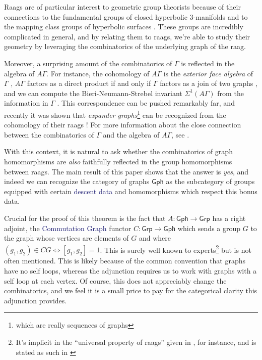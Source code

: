 \documentclass[12pt]{article}
\theoremstyle{definition}
\theoremstyle{theorem}
\newcommand*{\catFont}[1]{\mathsf{#1}}
\newcommand{\Grp}{\catFont{Grp}}
\newcommand*{\important}[1]{\textcolor{MidnightBlue}{#1}}
\begin{document}
  Raags are of particular interest to geometric group theorists because
  of their connections to the fundamental groups of closed hyperbolic
  $3$-manifolds \cite{servatiusSURFACESUBGROUPSGRAPH} 
  and to the mapping class groups of hyperbolic surfaces 
  \cite{kimGeometryCurveGraph2014}.
  These groups are incredibly complicated in general, and by relating
  them to raags, we're able to study their geometry by leveraging
  the combinatorics of the underlying graph of the raag.

  Moreover, a surprising amount of the combinatorics of $\Gamma$ is 
  reflected in the algebra of $A\Gamma$. For instance, the
  cohomology of $A \Gamma$ is the \emph{exterior face algebra} 
  of $\Gamma$ \cite{sabalkaRigidityIsomorphismProblem2009},
  $A\Gamma$ factors as a direct product if and only if $\Gamma$ factors
  as a join of two graphs \cite{servatiusAutomorphismsGraphGroups1989b},
  and we can compute the Bieri-Neumann-Strebel invariant $\Sigma^1(A\Gamma)$
  from the information in $\Gamma$ \cite{meierBieriNeumannStrebelInvariantsGraph1993}.
  This correspondence can be pushed remarkably far, and recently it was
  shown that \emph{expander graphs}\footnote{which are really sequences of graphs}
  can be recognized from the cohomology of their raags
  \cite{floresExpandersRightangledArtin2020}! For more information about the 
  close connection between the combinatorics of $\Gamma$ and the algebra of
  $A\Gamma$, see 
  \cite{floresExpandersRightangledArtin2020, koberdaGeometryCombinatoricsRightangled2021}.
  
  With this context, it is natural to ask whether the combinatorics
  of graph homomorphisms are \emph{also} faithfully reflected in the 
  group homomorphisms between raags. The main result of this paper shows
  that the answer is \emph{yes}, and indeed we can recognize the category
  of graphs $\mathsf{Gph}$ as the subcategory of groups equipped with 
  certain \important{descent data} and homomorphisms which respect this
  bonus data.

  Crucial for the proof of this theorem is the fact that 
  $A : \mathsf{Gph} \to \Grp$ has a right adjoint, the \important{Commutation Graph}
  functor $C : \Grp \to \mathsf{Gph}$ which sends a group $G$ to the graph 
  whose vertices are elements of $G$ and where $(g_1,g_2) \in CG \iff [g_1,g_2]=1$. 
  This is surely well known to 
  experts\footnote{It's implicit in the ``universal property of raags'' given 
  in \cite{koberdaRIGHTANGLEDARTINGROUPS}, for instance, and is stated as
  such in \cite{servatiusAutomorphismsGraphGroups1989b}} but is not often 
  mentioned. This is likely because of the common convention that graphs 
  have no self loops, whereas the adjunction requires us to work with graphs
  with a self loop at each vertex. Of course, this does not appreciably 
  change the combinatorics, and we feel it is a small price to pay for the 
  categorical clarity this adjunction provides.
\end{document}
